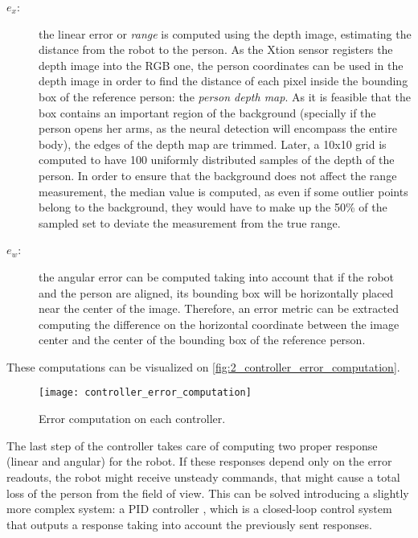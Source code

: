\begin{description}
	\item[$e_x$:] the linear error or \textit{range} is computed using the depth image, estimating the distance from the robot to the person. As the Xtion sensor registers the depth image into the RGB one, the person coordinates can be used in the depth image in order to find the distance of each pixel inside the bounding box of the reference person: the \textit{person depth map}. As it is feasible that the box contains an important region of the background (specially if the person opens her arms, as the neural detection will encompass the entire body), the edges of the depth map are trimmed. Later, a 10x10 grid is computed to have 100 uniformly distributed samples of the depth of the person. In order to ensure that the background does not affect the range measurement, the median value is computed, as even if some outlier points belong to the background, they would have to make up the 50\% of the sampled set to deviate the measurement from the true range.
	
	\item[$e_w$:] the angular error can be computed taking into account that if the robot and the person are aligned, its bounding box will be horizontally placed near the center of the image. Therefore, an error metric can be extracted computing the difference on the horizontal coordinate between the image center and the center of the bounding box of the reference person.
\end{description}

These computations can be visualized on \autoref{fig:2_controller_error_computation}.


\begin{figure}[h]
	\centering
	\texttt{[image: controller\_error\_computation]}
	\caption{Error computation on each controller.}
	\label{fig:2_controller_error_computation}
\end{figure}

The last step of the controller takes care of computing two proper response (linear and angular) for the robot. If these responses depend only on the error readouts, the robot might receive unsteady commands, that might cause a total loss of the person from the field of view. This can be solved introducing a slightly more complex system: a PID controller \cite{pid_controllers}, which is a closed-loop control system that outputs a response taking into account the previously sent responses.



